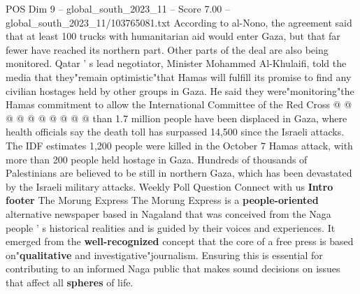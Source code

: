 \begin{textsample}{POS Dim 9 – global\_south\_2023\_11 – Score 7.00 – global\_south\_2023\_11/103765081.txt}
According to al-Nono, the agreement said that at least 100 trucks with humanitarian aid would enter Gaza, but that far fewer have reached its northern part.
Other parts of the deal are also being monitored.
Qatar ' s lead negotiator, Minister Mohammed Al-Khulaifi, told the media that they"remain optimistic"that Hamas will fulfill its promise to find any civilian hostages held by other groups in Gaza.
He said they were"monitoring"the Hamas commitment to allow the International Committee of the Red Cross @ @ @ @ @ @ @ @ @ @ than 1.7 million people have been displaced in Gaza, where health officials say the death toll has surpassed 14,500 since the Israeli attacks.
The IDF estimates 1,200 people were killed in the October 7 Hamas attack, with more than 200 people held hostage in Gaza.
Hundreds of thousands of Palestinians are believed to be still in northern Gaza, which has been devastated by the Israeli military attacks.
Weekly Poll Question Connect with us \textbf{Intro} \textbf{footer} The Morung Express The Morung Express is a \textbf{people-oriented} alternative newspaper based in Nagaland that was conceived from the Naga people ' s historical realities and is guided by their voices and experiences.
It emerged from the \textbf{well-recognized} concept that the core of a free press is based on"\textbf{qualitative} and investigative"journalism.
Ensuring this is essential for contributing to an informed Naga public that makes sound decisions on issues that affect all \textbf{spheres} of life.

\end{textsample}
